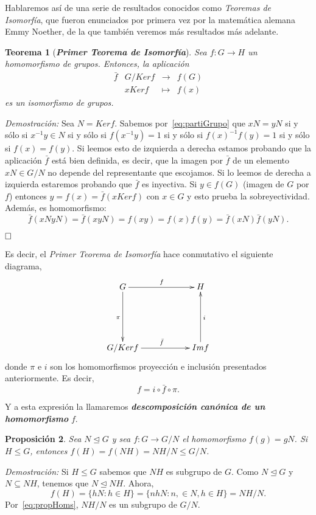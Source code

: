 \documentclass[12pt]{article}
\newtheorem{theorem}{Teorema}[section]
\newtheorem{proposition}[theorem]{Proposición}
\begin{document}
Hablaremos así de una serie de resultados conocidos como \textit{Teoremas de Isomorfía}, que fueron enunciados por primera vez por la matemática alemana Emmy Noether, de la que también veremos más resultados más adelante.

\begin{theorem}[\textbf{\textit{Primer Teorema de Isomorfía}}]
Sea $f \colon G \longrightarrow H$ un homomorfismo de grupos. Entonces, la aplicación $$\begin{array}{rccl}
\bar{f} &G/Ker f&\longrightarrow &f(G) \\
&xKer f& \longmapsto &f(x)
\end{array}
$$
es un isomorfismo de grupos.
\end{theorem}
\emph{Demostración: }Sea $N = Ker f$. Sabemos por~\ref{eq:partiGrupo} que $xN = yN$ si y sólo si $x^{-1}y \in N$ si y sólo si $f(x^{-1}y)=1$ si y sólo si $f(x)^{-1}f(y) = 1$ si y sólo si $f(x)=f(y)$. Si leemos esto de izquierda a derecha estamos probando que la aplicación $\bar{f}$ está bien definida, es decir, que la imagen por $\bar{f}$ de un elemento $xN \in G/N$ no depende del representante que escojamos. Si lo leemos de derecha a izquierda estaremos probando que $\bar{f}$ es inyectiva. Si $y \in f(G)$ (imagen de $G$ por $f$) entonces $y=f(x)=\bar{f}(xKer f)$ con $x\in G$ y esto prueba la sobreyectividad. Además, es homomorfismo: $$\bar{f}(xNyN)= \bar{f}(xyN)=f(xy)=f(x)f(y) =\bar{f}(xN) \bar{f}(yN).$$ 

$\hfill \square$

Es decir, el \textit{Primer Teorema de Isomorfía} hace conmutativo el siguiente diagrama, $$\xymatrix @=2cm {G\ar[r]^{f} \ar[d]_\pi & H \\ G/Ker f \ar[r]^{\bar{f}} & Im f \ar[u]_{i}  }$$
donde $\pi$ e $i$ son los homomorfismos proyección e inclusión presentados anteriormente. Es decir, $$f = i \circ \bar{f} \circ \pi.$$

Y a esta expresión la llamaremos \textbf{\textit{descomposición canónica de un homomorfismo}} $f$.

\begin{proposition}\label{eq:lemIsom} Sea $N \unlhd G$ y sea $f \colon G \longrightarrow G/N$ el homomorfismo $f(g) = gN$. Si $H \leq G$, entonces $f(H) = f(NH)=NH/N \leq G/N$.
\end{proposition}
\emph{Demostración: }Si $H \leq G$ sabemos que $NH$ es subgrupo de $G$. Como $N \unlhd G$ y $N \subseteq NH$, tenemos que $N \unlhd NH$. Ahora, $$f(H) = \lbrace hN : h \in H \rbrace = \lbrace nhN :n, \in N, h \in H \rbrace = NH/N.$$ Por~\ref{eq:propHoms}, $NH/N$ es un subgrupo de $G/N$.
\end{document}
